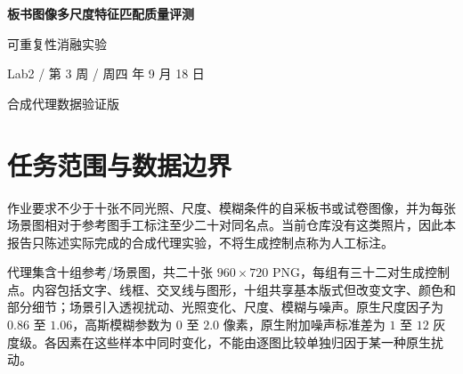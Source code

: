 
\usepackage{booktabs,tabularx,caption}
\captionsetup{font=small,labelfont=bf,skip=5pt}
\graphicspath{{../figures/p2/}}
\linespread{1.25}
\newcommand{\filepath}[1]{\nolinkurl{#1}}
\newcommand{\R}{\mathcal{R}}
\newcommand{\Sset}{\mathcal{S}}
\newcommand{\Mset}{\mathcal{M}}


\begin{center}
{\LARGE\bfseries 板书图像多尺度特征匹配质量评测}\par
\vspace{3mm}
{\large 可重复性消融实验}\par
\vspace{2mm}
{\small Lab2 / 第 3 周 / 周四  年 9 月 18 日}\par
{\small 合成代理数据验证版}
\end{center}

\begin{abstract}
面向拍摄板书与扫描试卷中的特征不稳定问题，建立单文件评测流程，比较 Sobel、LoG、Harris、Shi-Tomasi 和 SIFT 五类完整匹配管线，考察理想及高斯低通、高通预处理、外部图像金字塔与非极大值抑制的作用。采用共同可见区域内的几何重复率、双向比例检验后的匹配正确率、条件定位误差和每图对运行时间，并绘制图像尺度、附加噪声及金字塔深度曲线。实验对象为十组程序生成的试卷风格图像，几何控制点由生成器给出。结果用于验证评测口径及分析参数敏感性，不作为真实板书效果的证明。对预处理和多尺度的评价应同时考虑空间覆盖、误差、匹配数量与时间，不能仅由一项比例指标判定可信度。当前材料未包含自采照片或人工同名点标注，因而尚未满足作业的数据采集条件。
\end{abstract}

\section{任务范围与数据边界}
作业要求不少于十张不同光照、尺度、模糊条件的自采板书或试卷图像，并为每张场景图相对于参考图手工标注至少二十对同名点。当前仓库没有这类照片，因此本报告只陈述实际完成的合成代理实验，不将生成控制点称为人工标注。

代理集含十组参考/场景图，共二十张 $960\times720$ PNG，每组有三十二对生成控制点。内容包括文字、线框、交叉线与图形，十组共享基本版式但改变文字、颜色和部分细节；场景引入透视扰动、光照变化、尺度、模糊与噪声。原生尺度因子为 $0.86$ 至 $1.06$，高斯模糊参数为 $0$ 至 $2.0$ 像素，原生附加噪声标准差为 $1$ 至 $12$ 灰度级。各因素在这些样本中同时变化，不能由逐图比较单独归因于某一种原生扰动。

